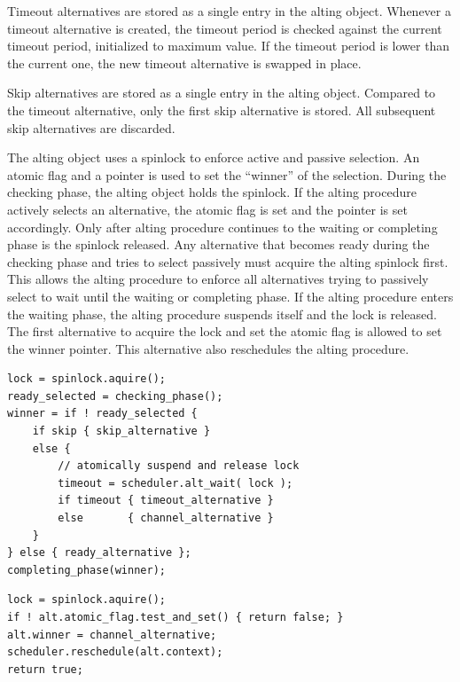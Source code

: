 Timeout alternatives are stored as a single entry in the alting object. Whenever a timeout alternative is created, the timeout period is checked against the current timeout period, initialized to maximum value. If the timeout period is lower than the current one, the new timeout alternative is swapped in place.

Skip alternatives are stored as a single entry in the alting object. Compared to the timeout alternative, only the first skip alternative is stored. All subsequent skip alternatives are discarded.

The alting object uses a spinlock to enforce active and passive selection. An atomic flag and a pointer is used to set the ``winner'' of the selection. During the checking phase, the alting object holds the spinlock. If the alting procedure actively selects an alternative, the atomic flag is set and the pointer is set accordingly. Only after alting procedure continues to the waiting or completing phase is the spinlock released. Any alternative that becomes ready during the checking phase and tries to select passively must acquire the alting spinlock first. This allows the alting procedure to enforce all alternatives trying to passively select to wait until the waiting or completing phase. 
If the alting procedure enters the waiting phase, the alting procedure suspends itself and the lock is released. The first alternative to acquire the lock and set the atomic flag is allowed to set the winner pointer. This alternative also reschedules the alting procedure. 

\begin{lstfloat}
\begin{lstlisting}[caption={Code example of alting.}, label={lst:code_example_alting}, style={CustomC}]
lock = spinlock.aquire();
ready_selected = checking_phase();
winner = if ! ready_selected {
    if skip { skip_alternative }
    else {
        // atomically suspend and release lock
        timeout = scheduler.alt_wait( lock );
        if timeout { timeout_alternative }
        else       { channel_alternative }
    }
} else { ready_alternative };
completing_phase(winner);
\end{lstlisting}
\end{lstfloat}

\begin{lstfloat}
\begin{lstlisting}[caption={Code example of alting.}, label={lst:code_example_alting}, style={CustomC}]
lock = spinlock.aquire();
if ! alt.atomic_flag.test_and_set() { return false; }
alt.winner = channel_alternative;
scheduler.reschedule(alt.context);
return true;
\end{lstlisting}
\end{lstfloat}

